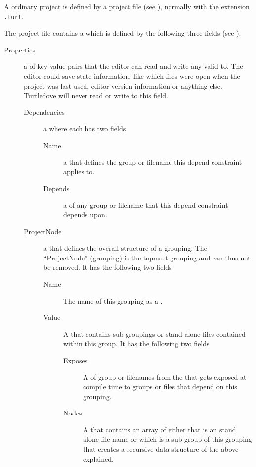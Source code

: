 A ordinary project is defined by a project file (see
), normally with the extension \texttt{.turt}.
  
The project file contains a  which is defined by the
following three fields (see ).
 
  

\begin{description}
\item[Properties] a  of key-value pairs that the editor can
  read and write any valid  to. The editor could save state
  information, like which files were open when the project was last used,
  editor version information or anything else. Turtledove will never read or
  write to this field.
  
  \begin{description}
  \item[Dependencies] a  where each 
    has two fields
    
    \begin{description}
    \item[Name] a  that defines the group or filename this
      depend constraint applies to.
      
    \item[Depends] a  of any group or filename that this
      depend constraint depends upon.
    \end{description}
    
    
  \item[ProjectNode] a  that defines the overall
    structure of a grouping. The ``ProjectNode'' (grouping) is the topmost
    grouping and can thus not be removed. It has the following two fields
    
    \begin{description}
    \item[Name] The name of this grouping as a .
      
    \item[Value] A  that contains sub groupings or
      stand alone files contained within this group. It has the following two fields
      
      \begin{description}
      \item[Exposes] A  of group or filenames from the
         that gets exposed at compile time to groups or files
        that depend on this grouping.
        
      \item[Nodes] A  that contains an array of either
         that is an stand alone file name or
         which is a sub group of this grouping that
        creates a recursive data structure of the above explained.
      \end{description}
    \end{description}      
  \end{description}
\end{description}


